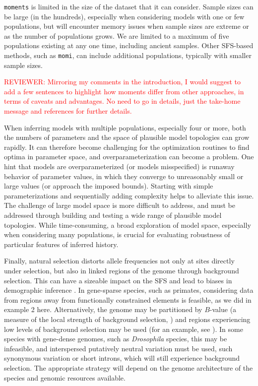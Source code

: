 \documentclass[]{article}
\newcommand{\reviewercomment}[1]{{\textcolor{red}{REVIEWER: #1}}}
\newcommand{\moments}{\texttt{moments}\xspace}
\newcommand{\momi}{\texttt{momi}\xspace}
\begin{document}
\moments is limited in the size of the dataset that it can consider. Sample
sizes can be large (in the hundreds), especially when considering models with
one or few populations, but will encounter memory issues when sample sizes are
extreme or as the number of populations grows. We are limited to a maximum of
five populations existing at any one time, including ancient samples. Other
SFS-based methods, such as \momi \cite{kamm2020efficiently, dilber2024faster},
can include additional populations, typically with smaller sample sizes.

\reviewercomment{Mirroring my comments in the introduction, I would suggest to add a few sentences to highlight how moments differ from other approaches, in terms of caveats and advantages. No need to go in details, just the take-home message and references for further details.}

When inferring models with multiple populations, especially four or more, both
the numbers of parameters and the space of plausible model topologies can grow
rapidly. It can therefore become challenging for the optimization routines to
find optima in parameter space, and overparameterization can become a problem.
One hint that models are overparameterized (or models misspecified) is runaway
behavior of parameter values, in which they converge to unreasonably small or
large values (or approach the imposed bounds). Starting with simple
parameterizations and sequentially adding complexity helps to alleviate this
issue. The challenge of large model space is more difficult to address, and
must be addressed through building and testing a wide range of plausible model
topologies. While time-consuming, a broad exploration of model space,
especially when considering many populations, is crucial for evaluating
robustness of particular features of inferred history.

Finally, natural selection distorts allele frequencies not only at sites
directly under selection, but also in linked regions of the genome through
background selection. This can have a sizeable impact on the SFS and lead to
biases in demographic inference \cite{ewing2016consequences, johri2021impact}.
In gene-sparse species, such as primates, considering data from regions away
from functionally constrained elements is feasible, as we did in example 2
here.  Alternatively, the genome may be partitioned by $B$-value (a
measure of the local strength of background
selection, \cite{mcvicker2009widespread}) and regions experiencing low levels of
background selection may be used (for an example,
see \cite{medina2023demographic}). In some species with gene-dense genomes, such as
\emph{Drosophila} species, this may be infeasible, and interspersed putatively
neutral variation must be used, such synonymous variation or short introns,
which will still experience background selection. The appropriate strategy will
depend on the genome architecture of the species and genomic resources
available.
\end{document}
